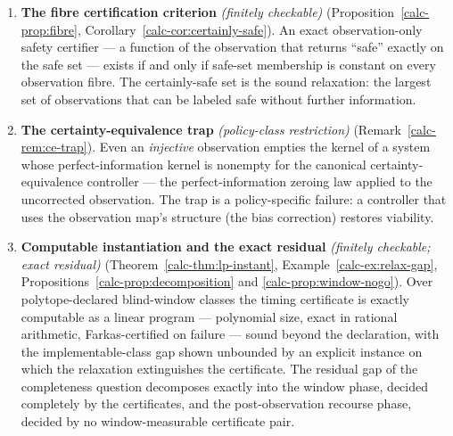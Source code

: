 \documentclass[10pt,twocolumn]{article}
\theoremstyle{definition}
\begin{document}
\begin{enumerate}
  full information. The mechanism is admissibility --- the common-action
  obstruction of Theorem~\ref{calc-thm:common-action} at minimal size --- and Example~\ref{calc-ex:hidden-mode} gives the hidden-mode instance.
\item
  \textbf{The fibre certification criterion} \emph{(finitely checkable)} (Proposition~\ref{calc-prop:fibre}, Corollary~\ref{calc-cor:certainly-safe}).
  An exact observation-only safety certifier --- a function of the
  observation that returns ``safe'' exactly on the safe set --- exists
  if and only if safe-set membership is constant on every observation
  fibre. The certainly-safe set is the sound relaxation: the largest set
  of observations that can be labeled safe without further information.
\item
  \textbf{The certainty-equivalence trap} \emph{(policy-class restriction)} (Remark~\ref{calc-rem:ce-trap}). Even an
  \emph{injective} observation empties the kernel of a system whose
  perfect-information kernel is nonempty for the canonical
  certainty-equivalence controller --- the perfect-information zeroing
  law applied to the uncorrected observation. The trap is a
  policy-specific failure: a controller that uses the observation map's
structure (the bias correction) restores viability.
\item
  \textbf{Computable instantiation and the exact residual} \emph{(finitely checkable;
  exact residual)} (Theorem~\ref{calc-thm:lp-instant}, Example~\ref{calc-ex:relax-gap},
  Propositions~\ref{calc-prop:decomposition} and \ref{calc-prop:window-nogo}). Over
  polytope-declared blind-window classes the timing certificate is exactly
  computable as a linear program --- polynomial size, exact in rational
  arithmetic, Farkas-certified on failure --- sound beyond the declaration,
  with the implementable-class gap shown unbounded by an explicit instance on
  which the relaxation extinguishes the certificate. The residual gap of the
  completeness question decomposes exactly into the window phase, decided
  completely by the certificates, and the post-observation recourse phase,
  decided by no window-measurable certificate pair.
\end{enumerate}
\end{document}
